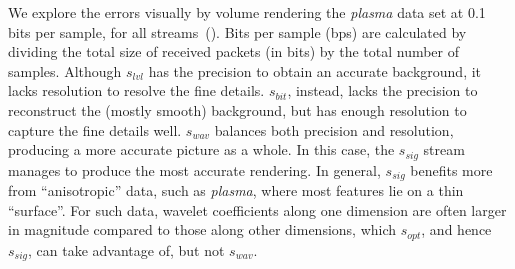 We explore the errors visually by volume rendering the \emph{plasma} data set at 0.1 bits per sample,
for all streams~(). Bits per sample (bps) are calculated by dividing the total size of received packets
(in bits) by the total number of samples. Although $s_{lvl}$ has the precision to obtain an accurate
background, it lacks resolution to resolve the fine details. $s_{bit}$, instead, lacks the precision
to reconstruct the (mostly smooth) background, but has enough resolution to capture the fine details
well. $s_{wav}$ balances both precision and resolution, producing a more accurate picture as a
whole. In this case, the $s_{sig}$ stream manages to produce the most accurate rendering. In general,
$s_{sig}$ benefits more from ``anisotropic'' data, such as \emph{plasma}, where most features lie on
a thin ``surface''. For such data, wavelet coefficients along one dimension are often larger in
magnitude compared to those along other dimensions, which $s_{opt}$, and hence $s_{sig}$, can take
advantage of, but not $s_{wav}$.
